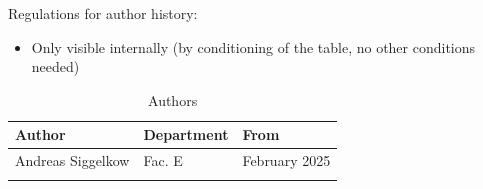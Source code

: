 Regulations for author history:
\begin{itemize}
  \item Only visible internally (by conditioning of the table, no other conditions needed)
\end{itemize}

\begin{table}[H]
\caption{Authors}
\label{tab:aluauth01}
\centering
\begin{tabularx}{\textwidth}{|X |X |X |}
  \hline
  Author & Department & From \\
  \hline
  \hline
  Andreas Siggelkow & Fac. E & February 2025 \\
  \hline
  && \\
  \hline
\end{tabularx}
\end{table}
